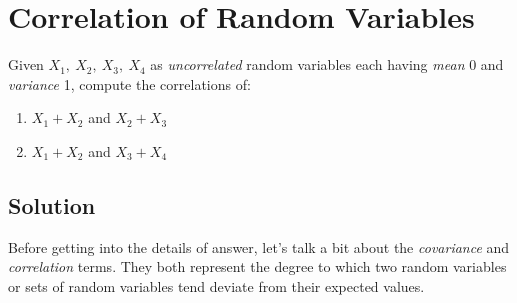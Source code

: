 \documentclass[12pt]{article}
\numberwithin{equation}{section}
\numberwithin{table}{section}
\numberwithin{figure}{section}
\begin{document}
\section{Correlation of Random Variables}
Given $X_1,\ X_2,\ X_3,\ X_4$ as \textit{uncorrelated} random variables each having \textit{mean} 0 and \textit{variance} 1, compute the correlations of:\\
\begin{enumerate}[label=(\alph*)]
	\item $X_1 + X_2$ and $X_2 + X_3$
	
	\item $X_1 + X_2$ and $X_3 + X_4$
\end{enumerate}

\subsection*{Solution}
Before getting into the details of answer, let's talk a bit about the \textit{covariance} and \textit{correlation} terms. They both represent the degree to which two random variables or sets of random variables tend deviate from their expected values.
\end{document}
